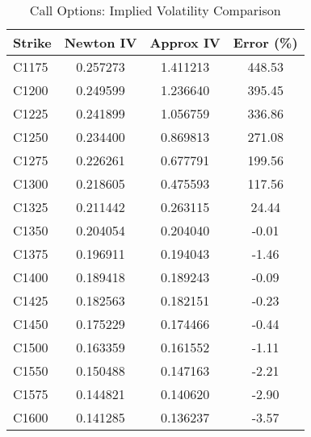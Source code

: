 \documentclass{article}
\begin{document}
\begin{table}[htbp]
    \centering
    \caption{Call Options: Implied Volatility Comparison}
    \label{tab:call_iv}
    \begin{tabular}{lccc}
        \toprule
        Strike & {Newton IV} & {Approx IV} & {Error (\%)} \\
        \midrule
        C1175  & 0.257273    & 1.411213    & 448.53       \\
        C1200  & 0.249599    & 1.236640    & 395.45       \\
        C1225  & 0.241899    & 1.056759    & 336.86       \\
        C1250  & 0.234400    & 0.869813    & 271.08       \\
        C1275  & 0.226261    & 0.677791    & 199.56       \\
        C1300  & 0.218605    & 0.475593    & 117.56       \\
        C1325  & 0.211442    & 0.263115    & 24.44        \\
        C1350  & 0.204054    & 0.204040    & -0.01        \\
        C1375  & 0.196911    & 0.194043    & -1.46        \\
        C1400  & 0.189418    & 0.189243    & -0.09        \\
        C1425  & 0.182563    & 0.182151    & -0.23        \\
        C1450  & 0.175229    & 0.174466    & -0.44        \\
        C1500  & 0.163359    & 0.161552    & -1.11        \\
        C1550  & 0.150488    & 0.147163    & -2.21        \\
        C1575  & 0.144821    & 0.140620    & -2.90        \\
        C1600  & 0.141285    & 0.136237    & -3.57        \\
        \bottomrule
    \end{tabular}
\end{table}
\end{document}
